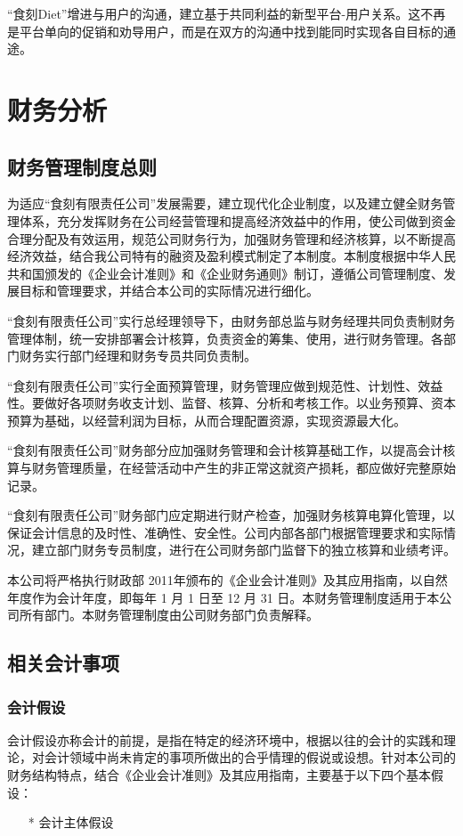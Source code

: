 \documentclass[UTF8,12pt]{ctexart}
\numberwithin{figure}{section}%
\begin{document}
\begin{spacing}{2}
“食刻Diet”增进与用户的沟通，建立基于共同利益的新型平台-用户关系。这不再是平台单向的促销和劝导用户，而是在双方的沟通中找到能同时实现各自目标的通途。

\newpage
\section{财务分析}
\subsection{财务管理制度总则}
为适应“食刻有限责任公司”发展需要，建立现代化企业制度，以及建立健全财务管理体系，充分发挥财务在公司经营管理和提高经济效益中的作用，使公司做到资金合理分配及有效运用，规范公司财务行为，加强财务管理和经济核算，以不断提高经济效益，结合我公司特有的融资及盈利模式制定了本制度。本制度根据中华人民共和国颁发的《企业会计准则》和《企业财务通则》制订，遵循公司管理制度、发展目标和管理要求，并结合本公司的实际情况进行细化。
 
“食刻有限责任公司”实行总经理领导下，由财务部总监与财务经理共同负责制财务管理体制，统一安排部署会计核算，负责资金的筹集、使用，进行财务管理。各部门财务实行部门经理和财务专员共同负责制。

“食刻有限责任公司”实行全面预算管理，财务管理应做到规范性、计划性、效益性。要做好各项财务收支计划、监督、核算、分析和考核工作。以业务预算、资本预算为基础，以经营利润为目标，从而合理配置资源，实现资源最大化。

“食刻有限责任公司”财务部分应加强财务管理和会计核算基础工作，以提高会计核算与财务管理质量，在经营活动中产生的非正常这就资产损耗，都应做好完整原始记录。

“食刻有限责任公司”财务部门应定期进行财产检查，加强财务核算电算化管理，以保证会计信息的及时性、准确性、安全性。公司内部各部门根据管理要求和实际情况，建立部门财务专员制度，进行在公司财务部门监督下的独立核算和业绩考评。

本公司将严格执行财政部 2011年颁布的《企业会计准则》及其应用指南，以自然年度作为会计年度，即每年 1 月 1 日至 12 月 31 日。本财务管理制度适用于本公司所有部门。本财务管理制度由公司财务部门负责解释。 

\subsection{相关会计事项}
\subsubsection{会计假设}
会计假设亦称会计的前提，是指在特定的经济环境中，根据以往的会计的实践和理论，对会计领域中尚未肯定的事项所做出的合乎情理的假说或设想。针对本公司的财务结构特点，结合《企业会计准则》及其应用指南，主要基于以下四个基本假设：
\begin{itemize}
	\item[*] 会计主体假设
	

\end{itemize}
\end{spacing}
\end{document}
